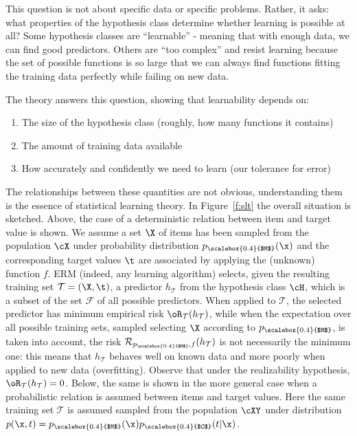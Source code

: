 This question is not about specific data or specific problems. Rather, it asks: what properties of the hypothesis class determine whether learning is possible at all? Some hypothesis classes are ``learnable'' - meaning that with enough data, we can find good predictors. Others are ``too complex'' and resist learning because the set of possible functions is so large that we can always find functions fitting the training data perfectly while failing on new data.

The theory answers this question, showing that learnability depends on:
\begin{enumerate}
\item The size of the hypothesis class (roughly, how many functions it contains)
\item The amount of training data available
\item How accurately and confidently we need to learn (our tolerance for error)
\end{enumerate}

The relationships between these quantities are not obvious, understanding them is the essence of statistical learning theory. In Figure~\ref{f:slt} the overall situation is sketched. Above, the case of a deterministic relation between item and target value is shown. We assume a set $\X$ of items has been sampled from the population $\cX$ under probability distribution $p_{\scalebox{0.4}{$M$}}(\x)$ and the corresponding target values $\t$ are associated by applying the (unknown) function $f$. ERM (indeed, any learning algorithm) selects, given the resulting training set $\mathcal{T}=(\X,\t)$, a predictor $h_{\mathcal{T}}$ from the hypothesis class $\cH$, which is a subset of the set $\mathcal{F}$ of all possible predictors. When applied to $\mathcal{T}$, the selected predictor has minimum empirical risk $\oR_{\mathcal{T}}(h_{\mathcal{T}})$, while when the expectation over all possible training sets, sampled selecting $\X$ according to $p_{\scalebox{0.4}{$M$}}$, is taken into account, the risk $\mathcal{R}_{p_{\scalebox{0.4}{$M$}},f}(h_{\mathcal{T}})$ is not necessarily the minimum one: this means that $h_{\mathcal{T}}$ behaves well on known data and more poorly when applied to new data (overfitting). Observe that under the realizability hypothesis, $\oR_{\mathcal{T}}(h_{\mathcal{T}})=0$.
Below, the same is shown in the more general case when a probabilistic relation is assumed between items and target values. Here the same training set $\mathcal{T}$ is assumed sampled from the population $\cXY$ under distribution $p(\x,t)=p_{\scalebox{0.4}{$M$}}(\x)p_{\scalebox{0.4}{$C$}}(t|\x)$.

